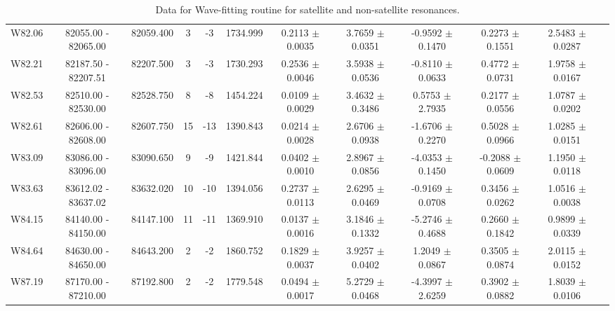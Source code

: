 \documentclass{article}
\begin{document}
\begin{table}[h]
{\begin{tabular}{|c|c|c|c|c|c|c|c|c|c|c|c|}
W82.06 & 82055.00 - 82065.00 & 82059.400 & 3 & -3 & 1734.999 & 0.2113 $\pm$ 0.0035 & 3.7659 $\pm$ 0.0351 &  -0.9592 $\pm$ 0.1470 & 0.2273 $\pm$ 0.1551 & 2.5483 $\pm$ 0.0287 \\

W82.21 & 82187.50 - 82207.51 & 82207.500 & 3 & -3 & 1730.293 & 0.2536 $\pm$ 0.0046 & 3.5938 $\pm$ 0.0536 &  -0.8110 $\pm$ 0.0633 & 0.4772 $\pm$ 0.0731 & 1.9758 $\pm$ 0.0167 \\

W82.53 & 82510.00 - 82530.00 & 82528.750 & 8 & -8 & 1454.224 & 0.0109 $\pm$ 0.0029 & 3.4632 $\pm$ 0.3486 &  0.5753 $\pm$ 2.7935 & 0.2177 $\pm$ 0.0556 & 1.0787 $\pm$ 0.0202 \\

W82.61 & 82606.00 - 82608.00 & 82607.750 & 15 & -13 & 1390.843 & 0.0214 $\pm$ 0.0028 & 2.6706 $\pm$ 0.0938 &  -1.6706 $\pm$ 0.2270 & 0.5028 $\pm$ 0.0966 & 1.0285 $\pm$ 0.0151 \\
         
W83.09 & 83086.00 - 83096.00 & 83090.650 & 9 & -9 & 1421.844 & 0.0402 $\pm$ 0.0010 & 2.8967 $\pm$ 0.0856 &  -4.0353 $\pm$ 0.1450 & -0.2088 $\pm$ 0.0609 & 1.1950 $\pm$ 0.0118 \\

W83.63 & 83612.02 - 83637.02 & 83632.020 & 10 & -10 & 1394.056 & 0.2737 $\pm$ 0.0113 & 2.6295 $\pm$ 0.0469 & -0.9169 $\pm$ 0.0708 & 0.3456 $\pm$ 0.0262 & 1.0516 $\pm$ 0.0038 \\

W84.15 & 84140.00 - 84150.00 & 84147.100 & 11 & -11 & 1369.910 & 0.0137 $\pm$ 0.0016 & 3.1846 $\pm$ 0.1332 & -5.2746 $\pm$ 0.4688 & 0.2660 $\pm$ 0.1842 & 0.9899 $\pm$ 0.0339 \\

W84.64 & 84630.00 - 84650.00 & 84643.200 & 2 & -2 & 1860.752 & 0.1829 $\pm$ 0.0037 & 3.9257 $\pm$ 0.0402 &  1.2049 $\pm$ 0.0867 & 0.3505 $\pm$ 0.0874 & 2.0115 $\pm$ 0.0152 \\

W87.19 & 87170.00 - 87210.00 & 87192.800 & 2 & -2 & 1779.548 & 0.0494 $\pm$ 0.0017 & 5.2729 $\pm$ 0.0468 & -4.3997 $\pm$ 2.6259 & 0.3902 $\pm$ 0.0882 & 1.8039 $\pm$ 0.0106 \\

\hline
\end{tabular}
\vspace{-1.5cm} %
}
\caption{Data for Wave-fitting routine for satellite and non-satellite resonances.}
\end{table}
\end{document}
